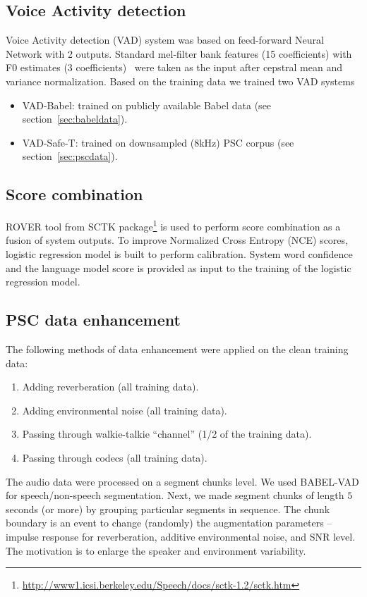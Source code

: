 \documentclass{article}
\begin{document}
\subsection{Voice Activity detection}
Voice Activity detection (VAD) system was based on feed-forward Neural Network with 2 outputs.
Standard mel-filter bank features (15 coefficients) with F0 estimates (3 coefficients)~\cite{povey:ICASSP:2014:F0} were taken as the input after cepstral mean and variance normalization.
Based on the training data we trained two VAD systems 
\begin{itemize}
    \item VAD-Babel: trained on publicly available Babel data (see section~\ref{sec:babeldata}).
    \item VAD-Safe-T: trained on downsampled (8kHz) PSC corpus (see section~\ref{sec:pscdata}).
\end{itemize}

\subsection{Score combination}
ROVER tool from SCTK 
package\footnote{
\url{http://www1.icsi.berkeley.edu/Speech/docs/sctk-1.2/sctk.htm}
}
is used to perform score combination as a fusion of system outputs. To
improve Normalized Cross Entropy (NCE) scores, logistic regression model is 
built to perform calibration. System word confidence and the language
model score is provided as input to the training of the logistic regression model. 


\subsection{PSC data enhancement}
\label{sec:channel}
The following methods of data enhancement were applied on the clean training data:
\begin{enumerate}
  \item Adding reverberation (all training data).
  \item Adding environmental noise (all training data).
  \item Passing through walkie-talkie ``channel'' (1/2 of the training data).
  \item Passing through codecs (all training data).
\end{enumerate}

The audio data were processed on a segment chunks level. We used BABEL-VAD
for speech/non-speech segmentation. Next, we made segment chunks of length $5$ seconds (or more) by grouping particular segments in sequence. The chunk boundary is an event to change (randomly) the augmentation parameters -- impulse response for reverberation,  additive environmental noise, and SNR level. The motivation is to enlarge the speaker and environment variability.
\end{document}
